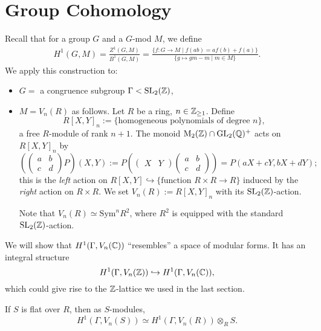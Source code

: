 \section{Group Cohomology}
Recall that for a group $G$ and a $G$-mod $M$,
we define \begin{align*}
    H^1(G, M) = \frac{Z^1(G, M )}{B^1(G, M )}
    = \frac{\{f  :G\to M\mid f(ab) = af(b) + f(a)\}}{\{g\mapsto gm - m\mid m\in M \}}.
\end{align*}
We apply this construction to:\begin{itemize}
    \item $G = $ a congruence subgroup $\Gamma < \operatorname{SL}_2(\mathbb{Z})$,
    \item $M = V_n(R)$ as follows. Let $R$ be a ring, $n\in\mathbb{Z}_{\ge 1}$.
    Define \[R[X, Y]_n := \{\text{homogeneous polynomials of degree }n\},\]
    a free $R$-module of rank $n+1$.
    The monoid $\mathrm{M}_2(\mathbb{Z})\cap\operatorname{GL}_2(\mathbb{Q})^+$ acts on $R[X, Y]_n$ by
    \[\left( \begin{pmatrix}
        a & b\\ c & d
    \end{pmatrix}P \right)(X, Y) := P\left( \begin{pmatrix}
        X & Y 
    \end{pmatrix} \begin{pmatrix}
        a & b \\ c & d
    \end{pmatrix}\right) = P(aX + cY, bX + dY);\]
    this is the \textit{left} action on $R[X, Y]\hookrightarrow \{\text{function } R\times R\to R\}$
    induced by the \textit{right} action on $R\times R$.
    We set $V_n(R) := R[X, Y]_n$ with its $\operatorname{SL}_2(\mathbb{Z})$-action.

    Note that $V_n(R)\simeq \mathrm{Sym}^nR^2$, where $R^2$ is equipped with the standard $\operatorname{SL}_2(\mathbb{Z})$-action.
\end{itemize}
We will show that $H^1(\Gamma, V_n(\mathbb{C}))$ ``resembles''
a space of modular forms. It has an integral structure
\[H^1(\Gamma, V_n(\mathbb{Z}))\hookrightarrow H^1(\Gamma, V_n(\mathbb{C})),\]
which could give rise to the $\mathbb{Z}$-lattice we used in the last section.
\begin{proposition}
    If $S$ is flat over $R$, then as $S$-modules,
    \[H^1(\Gamma, V_n(S))\simeq H^1(\Gamma, V_n(R))\otimes_R S. \]
\end{proposition}

